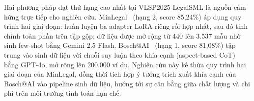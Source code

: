 Hai phương pháp đạt thứ hạng cao nhất tại VLSP2025-LegalSML là nguồn cảm hứng trực tiếp cho nghiên cứu. MinLegal~\cite{luan2025minlegal} (hạng 2, score 85,24\%) áp dụng quy trình hai giai đoạn: huấn luyện ba adapter LoRA riêng rồi hợp nhất, sau đó tinh chỉnh toàn phần trên tập gộp; dữ liệu được mở rộng từ 440 lên 3.537 mẫu nhờ sinh few-shot bằng Gemini 2.5 Flash. Bosch@AI~\cite{quang2025bosch} (hạng 1, score 81,08\%) tập trung vào sinh dữ liệu với chuỗi suy luận theo khía cạnh (aspect-based CoT) bằng GPT-4o, mở rộng lên 200.000 ví dụ. Nghiên cứu này kế thừa quy trình hai giai đoạn của MinLegal, đồng thời tích hợp ý tưởng trích xuất khía cạnh của Bosch@AI vào pipeline sinh dữ liệu, hướng tới sự cân bằng giữa chất lượng và chi phí trên môi trường tính toán hạn chế.

